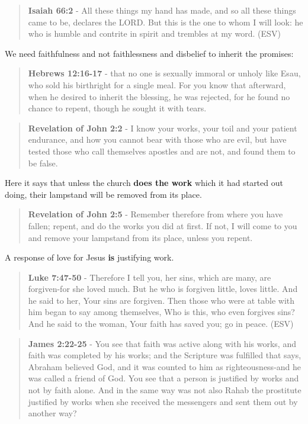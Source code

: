 \documentclass[11pt]{article}
\begin{document}
\begin{quote}
\textbf{Isaiah 66:2} - All these things my hand has made, and so all these things came to be, declares the LORD. But this is the one to whom I will look: he who is humble and contrite in spirit and trembles at my word. (ESV)
\end{quote}

We need faithfulness and not faithlessness and disbelief to inherit the promises:

\begin{quote}
\textbf{Hebrews 12:16-17} - that no one is sexually immoral or unholy like Esau, who sold his birthright for a single meal. For you know that afterward, when he desired to inherit the blessing, he was rejected, for he found no chance to repent, though he sought it with tears.
\end{quote}

\begin{quote}
\textbf{Revelation of John 2:2} - I know your works, your toil and your patient endurance, and how you cannot bear with those who are evil, but have tested those who call themselves apostles and are not, and found them to be false.
\end{quote}

Here it says that unless the church \textbf{does the work} which it had started out doing, their lampstand will be removed from its place.

\begin{quote}
\textbf{Revelation of John 2:5} - Remember therefore from where you have fallen; repent, and do the works you did at first. If not, I will come to you and remove your lampstand from its place, unless you repent.
\end{quote}

A response of love for Jesus \textbf{is} justifying work.

\begin{quote}
\textbf{Luke 7:47-50} - Therefore I tell you, her sins, which are many, are forgiven-for she loved much. But he who is forgiven little, loves little. And he said to her, Your sins are forgiven. Then those who were at table with him began to say among themselves, Who is this, who even forgives sins? And he said to the woman, Your faith has saved you; go in peace. (ESV)
\end{quote}

\begin{quote}
\textbf{James 2:22-25} - You see that faith was active along with his works, and faith was completed by his works; and the Scripture was fulfilled that says, Abraham believed God, and it was counted to him as righteousness-and he was called a friend of God. You see that a person is justified by works and not by faith alone. And in the same way was not also Rahab the prostitute justified by works when she received the messengers and sent them out by another way?
\end{quote}
\end{document}
